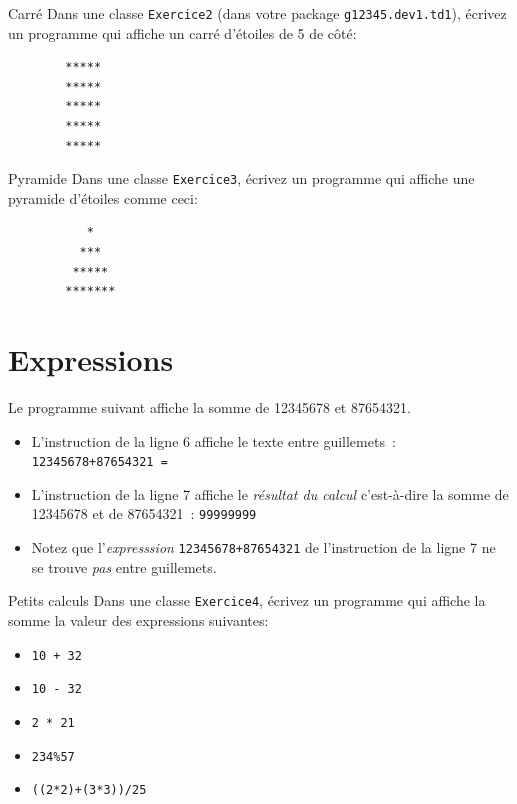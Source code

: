 \documentclass[a4paper,11pt]{article}
\begin{document}
	\begin{Exercice}{Carré}
		Dans une classe \texttt{Exercice2} (dans votre package \texttt{g12345.dev1.td1}), écrivez un programme qui affiche un carré d'étoiles de 5 de côté:

		\begin{verbatim}
		*****
		*****
		*****
		*****
		*****
		\end{verbatim}
	\end{Exercice}

	\begin{Exercice}{Pyramide}
		Dans une classe \texttt{Exercice3}, écrivez un programme qui affiche une pyramide d'étoiles comme ceci:

		\begin{verbatim}
		   *
		  ***
		 *****
		*******
		\end{verbatim}
	\end{Exercice}



\section{Expressions}

	Le programme suivant affiche la somme de 12345678 et 87654321.
	

	\begin{itemize}
		\item	L'instruction de la ligne 6 affiche le texte entre guillemets~: \texttt{12345678+87654321 = }
	
		\item L'instruction de la ligne 7 affiche le \emph{résultat du calcul} 
			c'est-à-dire la somme de 12345678 et de 87654321~:  \texttt{99999999}
	
		\item Notez que l'\emph{expresssion} \texttt{12345678+87654321} 
			de l'instruction de la ligne 7 ne se trouve \emph{pas} entre guillemets.
	\end{itemize}


	\begin{Exercice}{Petits calculs}
		Dans une classe \texttt{Exercice4}, écrivez un programme qui affiche la somme la valeur des expressions
		suivantes:
		\begin{itemize}
			\item	 \texttt{10 + 32}
			\item	 \texttt{10 - 32}
			\item  \texttt{2 * 21}
			\item  \texttt{234\%57}
			\item  \texttt{((2*2)+(3*3))/25}
		\end{itemize}
	\end{Exercice}
	
\end{document}
